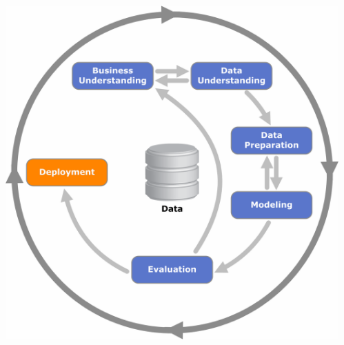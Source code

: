 \documentclass[10pt]{beamer}
\begin{document}
\begin{frame}{}

\begin{columns}[C]
    \begin{column}{.5\textwidth}
    	
    \end{column}
       
    \begin{column}{.5\textwidth}
    \vspace{-0em}
	\begin{center}
   		\includegraphics[width=\textwidth]{images/crisp-d.png}
    \end{center}
    \end{column}
  \end{columns}

\end{frame}
\end{document}
